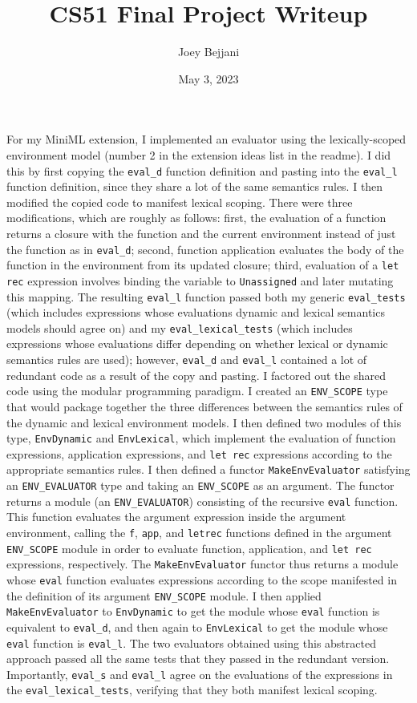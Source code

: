 \documentclass[12pt]{article}
\begin{document}
\title{CS51 Final Project Writeup}
\author{Joey Bejjani}
\date{May 3, 2023}

\maketitle

\qquad For my MiniML extension, I implemented an evaluator using the lexically-scoped environment model (number 2 in the extension ideas list in the readme). I did this by first copying the {\tt eval\_d} function definition and pasting into the {\tt eval\_l} function definition, since they share a lot of the same semantics rules. I then modified the copied code to manifest lexical scoping. There were three modifications, which are roughly as follows: first, the evaluation of a function returns a closure with the function and the current environment instead of just the function as in {\tt eval\_d}; second, function application evaluates the body of the function in the environment from its updated closure; third, evaluation of a {\tt let rec} expression involves binding the variable to {\tt Unassigned} and later mutating this mapping. The resulting {\tt eval\_l} function passed both my generic {\tt eval\_tests} (which includes expressions whose evaluations dynamic and lexical semantics models should agree on) and my {\tt eval\_lexical\_tests} (which includes expressions whose evaluations differ depending on whether lexical or dynamic semantics rules are used); however, {\tt eval\_d} and {\tt eval\_l} contained a lot of redundant code as a result of the copy and pasting. I factored out the shared code using the modular programming paradigm. I created an {\tt ENV\_SCOPE} type that would package together the three differences between the semantics rules of the dynamic and lexical environment models. I then defined two modules of this type, {\tt EnvDynamic} and {\tt EnvLexical}, which implement the evaluation of function expressions, application expressions, and {\tt let rec} expressions according to the appropriate semantics rules. I then defined a functor {\tt MakeEnvEvaluator} satisfying an {\tt ENV\_EVALUATOR} type and taking an {\tt ENV\_SCOPE} as an argument. The functor returns a module (an {\tt ENV\_EVALUATOR}) consisting of the recursive {\tt eval} function. This function evaluates the argument expression inside the argument environment, calling the {\tt f}, {\tt app}, and {\tt letrec} functions defined in the argument {\tt ENV\_SCOPE} module in order to evaluate function, application, and {\tt let rec} expressions, respectively. The {\tt MakeEnvEvaluator} functor thus returns a module whose {\tt eval} function evaluates expressions according to the scope manifested in the definition of its argument {\tt ENV\_SCOPE} module. I then applied {\tt MakeEnvEvaluator} to {\tt EnvDynamic} to get the module whose {\tt eval} function is equivalent to {\tt eval\_d}, and then again to {\tt EnvLexical} to get the module whose {\tt eval} function is {\tt eval\_l}. The two evaluators obtained using this abstracted approach passed all the same tests that they passed in the redundant version. Importantly, {\tt eval\_s} and {\tt eval\_l} agree on the evaluations of the expressions in the {\tt eval\_lexical\_tests}, verifying that they both manifest lexical scoping.
\end{document}

